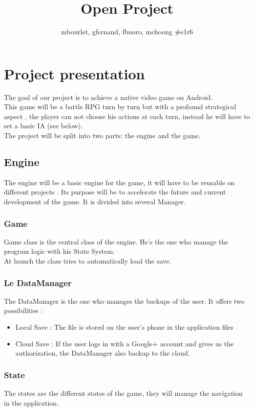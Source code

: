 \documentclass[16pt, oneside]{report}
\title{{\myfont Open Project}}
\author{mbourlet, gfernand, fbuoro, mchoong \#e1r6}
\date{}
\begin{document}
\maketitle

\chapter{Project presentation}
The goal of our project is to achieve a native video game on Android. \\
This game will be a battle RPG turn by turn but with a profound strategical aspect , the player can not choose his actions at each turn, instead he will have to set a basic IA (see below). \\
The project will be split into two parts: the engine and the game.

\section{Engine}
The engine will be a basic engine for the game, it will have to be reusable on different projects . Its purpose will be to accelerate the future and current development of the game. It is divided into several Manager.

\subsection{Game}
Game class is the central class of the engine. He's the one who manage the program logic with his State System. \\
At launch the class tries to automatically load the save.

\subsection{Le DataManager}
The DataManager is the one who manages the backups of the user. It offers two possibilities :
\begin {itemize}
	\item Local Save : The file is stored on the user's phone in the application files .
	\item Cloud Save : If the user logs in with a Google+ account and gives us the authorization, the DataManager also backup to the cloud. \\ 
\end {itemize}


\subsection{State}
The states are the different states of the game, they will manage the navigation in the application.\\
\end{document}

